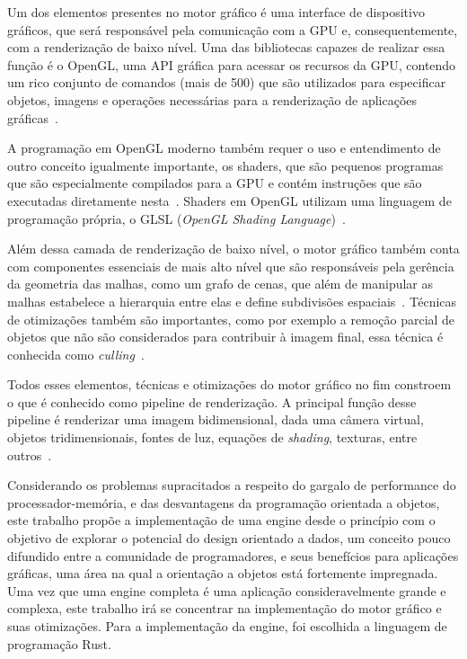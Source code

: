 \documentclass[11pt]{article}
\begin{document}
Um dos elementos 
presentes no motor gráfico é uma interface de dispositivo gráficos, que será responsável pela comunicação com a GPU 
e, consequentemente, com a renderização de baixo nível. Uma das bibliotecas capazes de realizar essa função é o OpenGL, uma 
API gráfica para acessar os recursos da GPU, contendo um rico conjunto de comandos (mais de 500) que são utilizados para 
especificar objetos, imagens e operações necessárias para a renderização de aplicações gráficas~\cite{shreiner2013opengl}.

A programação em OpenGL moderno também requer o uso e entendimento de outro conceito igualmente importante, os shaders, que 
são pequenos programas que são especialmente compilados para a GPU e contém instruções que são executadas diretamente 
nesta~\cite{shreiner2013opengl}. Shaders em OpenGL utilizam uma linguagem de programação própria, o GLSL (\textit{OpenGL 
Shading Language})~\cite{shreiner2013opengl}.

Além dessa camada de renderização de baixo nível, o motor gráfico também conta com componentes essenciais de mais alto nível 
que são responsáveis pela gerência da geometria das malhas, como um grafo de cenas, que além de manipular as malhas estabelece 
a hierarquia entre elas e define subdivisões espaciais~\cite{gregory2009game}. Técnicas de otimizações também são importantes, 
como por exemplo a remoção parcial de objetos que não são considerados para contribuir à imagem final, essa técnica é 
conhecida como \textit{culling}~\cite{akenine2008real}.

Todos esses elementos, técnicas e otimizações do motor gráfico no fim constroem o que é conhecido como pipeline de 
renderização. A principal função desse pipeline é renderizar uma imagem bidimensional, 
dada uma câmera virtual, objetos tridimensionais, fontes de luz, equações de \textit{shading}, texturas, entre 
outros~\cite{akenine2008real}.

Considerando os problemas supracitados a respeito do gargalo de performance do processador-memória, e das desvantagens da 
programação orientada a objetos, este trabalho propõe a implementação de uma engine desde o princípio com o objetivo de 
explorar o potencial do design orientado a dados, um conceito pouco difundido entre a comunidade de programadores, 
e seus benefícios para aplicações gráficas, uma área na qual a orientação a objetos está fortemente impregnada. Uma vez
que uma engine completa é uma aplicação consideravelmente grande e complexa, este trabalho irá se concentrar na implementação
do motor gráfico e suas otimizações. Para a implementação da engine, foi escolhida a linguagem de programação Rust.
\end{document}
